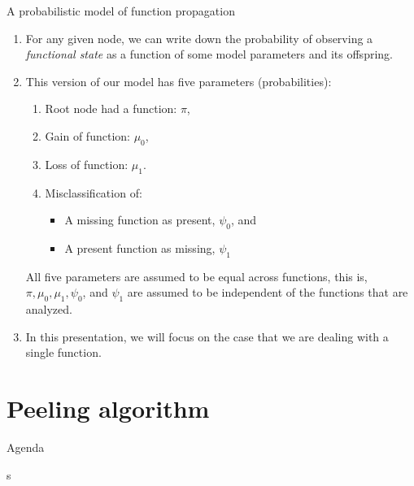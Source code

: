 \documentclass[9pt,ignorenonframetext,]{beamer}
\providecommand{\tightlist}{%
  \setlength{\itemsep}{0pt}\setlength{\parskip}{0pt}}
\begin{document}
\begin{frame}{A probabilistic model of function propagation}

\begin{enumerate}
\def\labelenumi{\arabic{enumi}.}
\item
  For any given node, we can write down the probability of observing a
  \emph{functional state} as a function of some model parameters and its
  offspring. \pause
\item
  This version of our model has five parameters (probabilities): \pause

  \begin{enumerate}
  \def\labelenumii{\alph{enumii}.}
  \tightlist
  \item
    Root node had a function: \(\pi\),
  \item
    Gain of function: \(\mu_0\),
  \item
    Loss of function: \(\mu_1\).
  \item
    Misclassification of:

    \begin{itemize}
    \tightlist
    \item
      A missing function as present, \(\psi_0\), and
    \item
      A present function as missing, \(\psi_1\) \pause
    \end{itemize}
  \end{enumerate}

  All five parameters are assumed to be equal across functions, this is,
  \(\pi, \mu_0, \mu_1, \psi_0\), and \(\psi_1\) are assumed to be
  independent of the functions that are analyzed.\pause
\item
  In this presentation, we will focus on the case that we are dealing
  with a single function.
\end{enumerate}

\end{frame}

\section{Peeling algorithm}\label{peeling-algorithm}

\begin{frame}[t]{Agenda}

\tableofcontents[currentsection]s

\end{frame}
\end{document}
